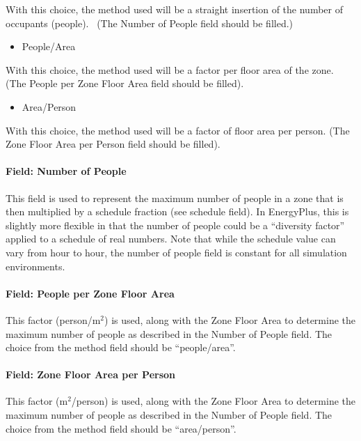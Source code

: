 With this choice, the method used will be a straight insertion of the number of occupants (people).~ (The Number of People field should be filled.)

\begin{itemize}
\tightlist
\item
  People/Area
\end{itemize}

With this choice, the method used will be a factor per floor area of the zone. (The People per Zone Floor Area field should be filled).

\begin{itemize}
\tightlist
\item
  Area/Person
\end{itemize}

With this choice, the method used will be a factor of floor area per person. (The Zone Floor Area per Person field should be filled).

\paragraph{Field: Number of People}\label{field-number-of-people}

This field is used to represent the maximum number of people in a zone that is then multiplied by a schedule fraction (see schedule field). In EnergyPlus, this is slightly more flexible in that the number of people could be a ``diversity factor'' applied to a schedule of real numbers. Note that while the schedule value can vary from hour to hour, the number of people field is constant for all simulation environments.

\paragraph{Field: People per Zone Floor Area}\label{field-people-per-zone-floor-area}

This factor (person/m\(^{2}\)) is used, along with the Zone Floor Area to determine the maximum number of people as described in the Number of People field. The choice from the method field should be ``people/area''.

\paragraph{Field: Zone Floor Area per Person}\label{field-zone-floor-area-per-person}

This factor (m\(^{2}\)/person) is used, along with the Zone Floor Area to determine the maximum number of people as described in the Number of People field. The choice from the method field should be ``area/person''.

